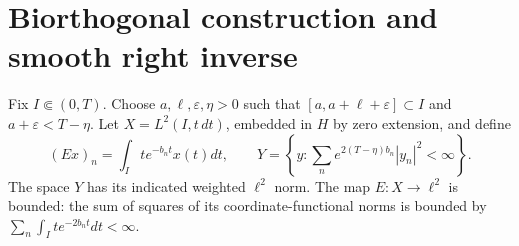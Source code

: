 \section{Biorthogonal construction and smooth right inverse}\label{sec:biorth}
Fix \(I\Subset(0,T)\). Choose \(a,\ell,\varepsilon,\eta>0\) such that \([a,a+\ell+\varepsilon]\subset I\) and \(a+\varepsilon<T-\eta\). Let \(X=L^2(I,t\,dt)\), embedded in \(H\) by zero extension, and define
\begin{equation}\label{eq:EY}
(Ex)_n=\int_I te^{-b_nt}x(t)dt,\qquad
Y=\left\{y:\sum_n e^{2(T-\eta)b_n}|y_n|^2<\infty\right\}.
\end{equation}
The space \(Y\) has its indicated weighted \(\ell^2\) norm. The map \(E:X\to\ell^2\) is bounded: the sum of squares of its coordinate-functional norms is bounded by \(\sum_n\int_I te^{-2b_nt}dt<\infty\).

